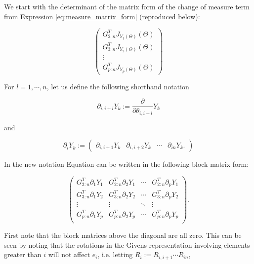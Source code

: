 \documentclass[ba]{imsart}
\numberwithin{equation}{section}
\theoremstyle{plain}
\begin{document}
\noindent We start with the determinant of the matrix form of the change of measure term from Expression \ref{eq:measure_matrix_form} (reproduced below):

\begin{equation}
\begin{pmatrix}
G_{2:n}^T J_{Y_1(\Theta)}(\Theta)\\
G_{3:n}^T J_{Y_2(\Theta)}(\Theta)\\
\vdots\\
G_{p:n}^T J_{Y_p(\Theta)}(\Theta)
\end{pmatrix}
\end{equation}

\noindent For $l = 1, \cdots, n$, let us define the following shorthand notation

\begin{equation}
\partial_{i,i+l} Y_k := \frac{\partial}{\partial \theta_{i,i+l}} Y_k
\end{equation}

\noindent and

\begin{equation}
\partial_{i} Y_k
:=
\begin{pmatrix}
\partial_{i,i+1} Y_k & \partial_{i,i+2} Y_k & \cdots & \partial_{in} Y_k.
\end{pmatrix}
\end{equation}

\noindent In the new notation Equation can be written in the following block matrix form:

\begin{equation}
\label{eq:matrix_blockform}
\begin{pmatrix}
G_{2:n}^T \partial_{1} Y_1 &G_{2:n}^T \partial_{2} Y_1 & \cdots & G_{2:n}^T \partial_{p} Y_1\\
G_{3:n}^T \partial_{1} Y_2 &G_{3:n}^T \partial_{2} Y_2 & \cdots & G_{3:n}^T \partial_{p} Y_2\\
\vdots & \vdots & \ddots & \vdots\\
G_{p:n}^T \partial_{1} Y_p &G_{p:n}^T \partial_{2} Y_p & \cdots & G_{p:n}^T \partial_{p} Y_p\\
\end{pmatrix}.
\end{equation}

\noindent First note that the block matrices above the diagonal are all zero.  This can be seen by noting that the rotations in the Givens representation involving elements greater than $i$ will not affect $e_i$, i.e. letting $R_i := R_{i,i+1} \cdots R_{in}$,
\end{document}
